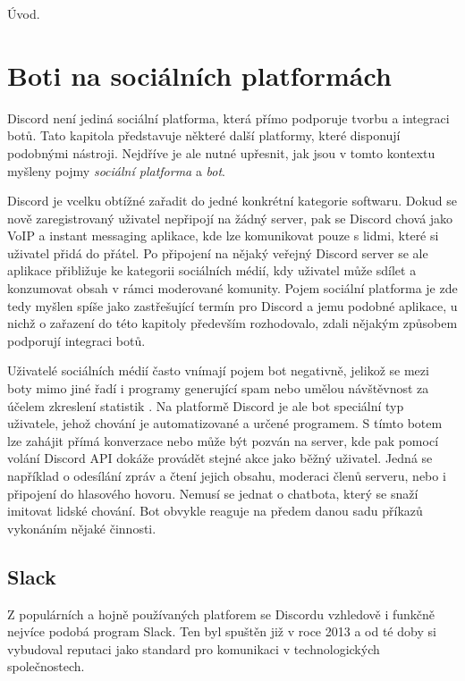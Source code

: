 \documentclass[FM]{tulthesis}
\begin{document}
	Úvod.
	
	\chapter{Boti na sociálních platformách}
	
	Discord není jediná sociální platforma, která přímo podporuje tvorbu a integraci botů. Tato kapitola představuje některé další platformy, které disponují podobnými nástroji. Nejdříve je ale nutné upřesnit, jak jsou v tomto kontextu myšleny pojmy \textit{sociální platforma} a \textit{bot}.
	
	Discord je vcelku obtížné zařadit do jedné konkrétní kategorie softwaru. Dokud se nově zaregistrovaný uživatel nepřipojí na žádný server, pak se Discord chová jako VoIP a instant messaging aplikace, kde lze komunikovat pouze s lidmi, které si uživatel přidá do přátel. Po připojení na nějaký veřejný Discord server se ale aplikace přibližuje ke kategorii sociálních médií, kdy uživatel může sdílet a konzumovat obsah v rámci moderované komunity. Pojem sociální platforma je zde tedy myšlen spíše jako zastřešující termín pro Discord a jemu podobné aplikace, u nichž o zařazení do této kapitoly především rozhodovalo, zdali nějakým způsobem podporují integraci botů.
	
	Uživatelé sociálních médií často vnímají pojem bot negativně, jelikož se mezi boty mimo jiné řadí i programy generující spam nebo umělou návštěvnost za účelem zkreslení statistik \cite{lit3}. Na platformě Discord je ale bot speciální typ uživatele, jehož chování je automatizované a určené programem. S tímto botem lze zahájit přímá konverzace nebo může být pozván na server, kde pak pomocí volání Discord API dokáže provádět stejné akce jako běžný uživatel. Jedná se například o odesílání zpráv a čtení jejich obsahu, moderaci členů serveru, nebo i připojení do hlasového hovoru. Nemusí se jednat o chatbota, který se snaží imitovat lidské chování. Bot obvykle reaguje na předem danou sadu příkazů vykonáním nějaké činnosti.
	
	\section{Slack}
	
	Z populárních a hojně používaných platforem se Discordu vzhledově i funkčně nejvíce podobá program Slack. Ten byl spuštěn již v roce 2013 a od té doby si vybudoval reputaci jako standard pro komunikaci v technologických společnostech. \cite{lit3}
	
\end{document}
